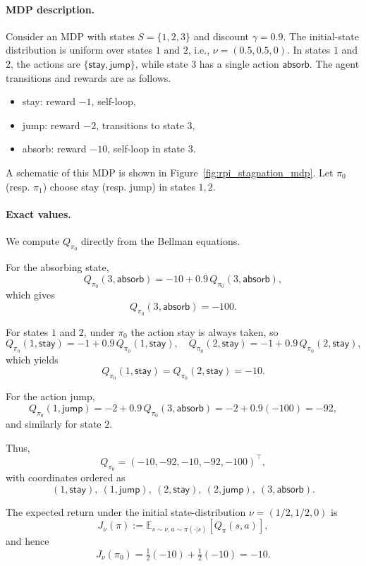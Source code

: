 \documentclass[twoside]{article}
\theoremstyle{plain}
\theoremstyle{definition}
\theoremstyle{remark}
\begin{document}
\paragraph{MDP description.}
Consider an MDP with states $S=\{1,2,3\}$ and discount $\gamma=0.9$. The initial-state distribution is uniform over states $1$ and $2$, i.e., $\nu = (0.5, 0.5, 0)$. In states $1$ and $2$, the actions are $\{\textsf{stay},\textsf{jump}\}$, while state $3$ has a single action $\textsf{absorb}$. The agent transitions and rewards are as follows.
\begin{itemize}
    \item \textsf{stay}: reward $-1$, self-loop,
    \item \textsf{jump}: reward $-2$, transitions to state $3$,
    \item \textsf{absorb}: reward $-10$, self-loop in state $3$.
\end{itemize}
A schematic of this MDP is shown in Figure~\ref{fig:rpi_stagnation_mdp}. Let $\pi_0$ (resp. $\pi_1$) choose \textsf{stay} (resp. \textsf{jump}) in states $1,2$.

\paragraph{Exact values.}
We compute $Q_{\pi_0}$ directly from the Bellman equations.

For the absorbing state,
\[
Q_{\pi_0}(3,\textsf{absorb})
= -10 + 0.9\, Q_{\pi_0}(3,\textsf{absorb}),
\]
which gives
\[
Q_{\pi_0}(3,\textsf{absorb}) = -100.
\]

For states $1$ and $2$, under $\pi_0$ the action \textsf{stay} is always taken, so
\[
Q_{\pi_0}(1,\textsf{stay})
= -1 + 0.9\, Q_{\pi_0}(1,\textsf{stay}),
\quad
Q_{\pi_0}(2,\textsf{stay})
= -1 + 0.9\, Q_{\pi_0}(2,\textsf{stay}),
\]
which yields
\[
Q_{\pi_0}(1,\textsf{stay}) = Q_{\pi_0}(2,\textsf{stay}) = -10.
\]

For the action \textsf{jump},
\[
Q_{\pi_0}(1,\textsf{jump})
= -2 + 0.9\, Q_{\pi_0}(3,\textsf{absorb})
= -2 + 0.9(-100) = -92,
\]
and similarly for state $2$.

Thus,
\[
Q_{\pi_0}
=
(-10,-92,-10,-92,-100)^\top,
\]
with coordinates ordered as
\[
(1,\textsf{stay}),\ (1,\textsf{jump}),\ (2,\textsf{stay}),\ (2,\textsf{jump}),\ (3,\textsf{absorb}).
\]

The expected return under the initial state-distribution $\nu = (1/2,1/2,0)$ is
\[
J_\nu(\pi) := \mathbb{E}_{s\sim \nu, a \sim \pi(\cdot|s)}[Q_\pi(s,a)],
\]
and hence
\[
J_\nu(\pi_0) = \tfrac12(-10) + \tfrac12(-10) = -10.
\]
\end{document}
